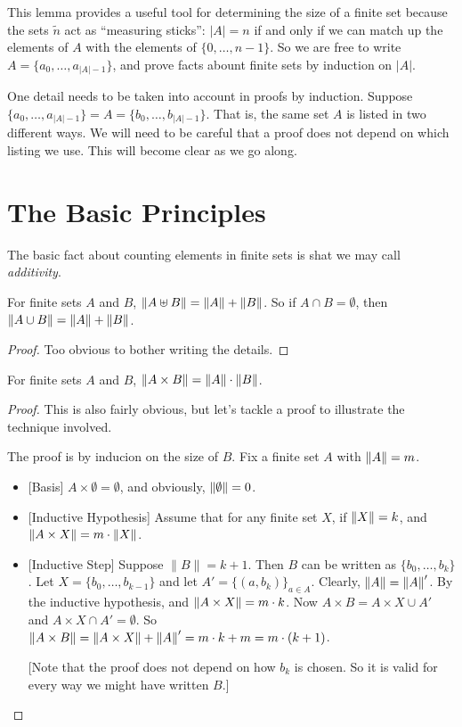 This lemma provides a useful tool for determining the size of a finite set because the sets $\tilde n$ act as ``measuring sticks'': $|A| = n$ if and only if we can match up the elements of $A$ with the elements of $\{0,\dotsc, n-1\}$. So we are free to write $A = \{a_0,\dotsc,a_{|A|-1}\}$, and prove facts abount finite sets by induction on $|A|$.

One detail needs to be taken into account in proofs by induction. 
Suppose $\{a_0,\dotsc,a_{|A|-1}\} = A = \{b_0,\dotsc,b_{|A|-1}\}$. That is, the same set $A$ is listed in two different ways. We will need to be careful that a proof does not depend on which listing we use. This will become clear as we go along.


\section{The Basic Principles}

The basic fact about counting elements in finite sets is shat we may call \emph{additivity}.

\begin{lemma}
	For finite sets $A$ and $B$, ${\lVert A\uplus B\rVert} = {\lVert A\rVert} + {\lVert B\rVert}$. So if $A\cap B=\emptyset$, then ${\lVert A\cup B\rVert} = {\lVert A\rVert} + {\lVert B\rVert}$.
	
	\begin{proof}
		Too obvious to bother writing the details.
	\end{proof}
\end{lemma}

\begin{lemma}
	For finite sets $A$ and $B$, ${\lVert A\times B\rVert}={\lVert A\rVert} \cdot{\lVert B\rVert}$.
	
	\begin{proof}
		This is also fairly obvious, but let's tackle a proof to illustrate the technique involved. 
		
		The proof is by inducion on the size of $B$. Fix a finite set $A$ with ${\lVert A\rVert}=m$. 
		\begin{itemize}
			\item{}[Basis] $A\times \emptyset = \emptyset$, and obviously, ${\lVert \emptyset\rVert} = 0$.
			\item{}[Inductive Hypothesis] Assume that for any finite set $X$, if ${\lVert X\rVert} = k$, and ${\lVert A\times X\rVert} = m \cdot {\lVert X\rVert}$.
			\item{}[Inductive Step] Suppose $\lVert B\rVert = k+1$. 
			Then $B$ can be written as $\{b_0,\dotsc,b_k\}$.
			Let $X = \{b_0,\ldots, b_{k-1}\}$ and let $A' = \{(a,b_k)\}_{a\in A}$. Clearly, ${\lVert A\rVert} = {\lVert A\rVert}'$.
			By the inductive hypothesis, and ${\lVert A\times X\rVert} = m\cdot k$.  
			Now $A\times B = A\times X \cup A'$ 
			and $A\times X\cap A' = \emptyset$.
			So ${\lVert A\times B\rVert} = {\lVert A\times X\rVert} + {\lVert A\rVert}' = m\cdot k + m = m\cdot(k+1)$.
			
			[Note that the proof does not depend on how $b_k$ is chosen. So it is valid for every way we might have written $B$.]
		\end{itemize}
	\end{proof}
\end{lemma}

